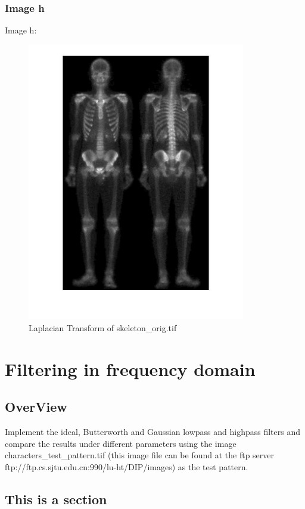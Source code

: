 \documentclass[11pt,oneside]{book}
\begin{document}
\subsection{Image h}
Image h:
\begin{figure}[!htb]
   \centering  
   \includegraphics[width=0.85\textwidth]{images/2/h.jpg}
   \caption{Laplacian Transform of skeleton\_orig.tif}  
\end{figure}
\chapter{Filtering in frequency domain}
\section{OverView}
Implement the ideal, Butterworth and Gaussian lowpass and highpass filters and compare the results under different parameters using the image characters\_test\_pattern.tif (this image file can be found at the ftp server ftp://ftp.cs.sjtu.edu.cn:990/lu-ht/DIP/images) as the test pattern.

\section{This is a section}
\end{document}
